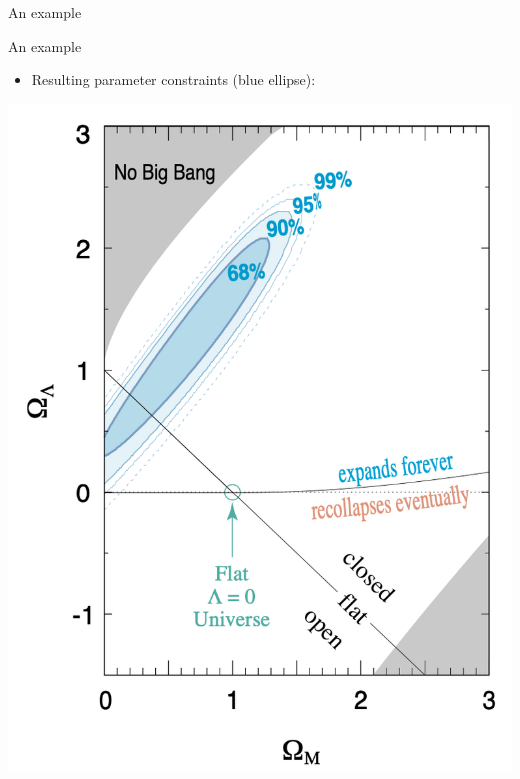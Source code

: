 \documentclass{beamer}
\begin{document}
\begin{frame}{An example}
\end{frame}

\begin{frame}{An example}
  \begin{itemize}
    \item Resulting parameter constraints (blue ellipse):
  \end{itemize}
  \includegraphics[height=0.6\textwidth]{pm-constraints}
\end{frame}
\end{document}
